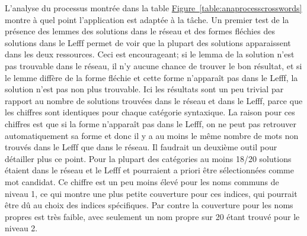 {L'analyse du processus montrée dans la table \hyperref[table:anaprocesscrosswords]{Figure~\ref*{table:anaprocesscrosswords}} montre à quel point l'application est adaptée à la tâche. Un premier test de la présence des lemmes des solutions dans le réseau et des formes fléchies des solutions dans le Lefff permet de voir que la plupart des solutions apparaissent dans les deux ressources. Ceci est encourageant; si le lemma de la solution n'est pas trouvable dans le réseau, il n'y aucune chance de trouver le bon résultat, et si le lemme diffère de la forme fléchie et cette forme n'apparaît pas dans le Lefff, la solution n'est pas non plus trouvable. Ici les résultats sont un peu trivial par rapport au nombre de solutions trouvées dans le réseau et dans le Lefff, parce que les chiffres sont identiques pour chaque catégorie syntaxique. La raison pour ces chiffres est que si la forme n'apparaît pas dans le Lefff, on ne peut pas retrouver automatiquement sa forme et donc il y a au moins le même nombre de mots non trouvés dans le Lefff que dans le réseau. Il faudrait un deuxième outil pour détailler plus ce point. Pour la plupart des catégories au moins 18/20 solutions étaient dans le réseau et le Lefff et pourraient a priori être sélectionnées comme mot candidat. Ce chiffre est un peu moins élevé pour les noms communs de niveau 1, ce qui montre une plus petite couverture pour ces indices, qui pourrait être dû au choix des indices spécifiques. Par contre la couverture pour les noms propres est très faible, avec seulement un nom propre sur 20 étant trouvé pour le niveau 2.

}
